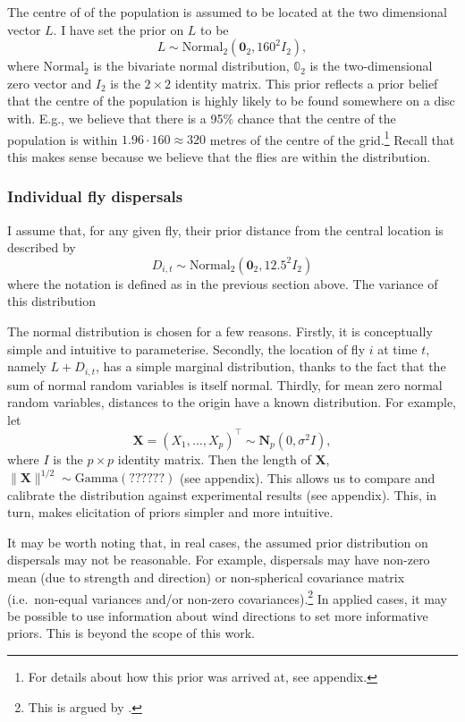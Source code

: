 \documentclass[
]{book}
\begin{document}
The centre of of the population is assumed to be located at the two dimensional vector \(L\). I have set the prior on \(L\) to be
\[
L \sim \mathrm {Normal}_2 (\mathbf 0_2, 160^2 I_2),
\]
where \(\mathrm{Normal}_2\) is the bivariate normal distribution, \(\mathbb 0_2\) is the two-dimensional zero vector and \(I_2\) is the \(2 \times 2\) identity matrix. This prior reflects a prior belief that the centre of the population is highly likely to be found somewhere on a disc with. E.g., we believe that there is a 95\% chance that the centre of the population is within \(1.96 \cdot 160 \approx 320\) metres of the centre of the grid.\footnote{For details about how this prior was arrived at, see appendix.} Recall that this makes sense because we believe that the flies are within the distribution.

\hypertarget{individual-fly-dispersals-1}{%
\subsubsection{Individual fly dispersals}\label{individual-fly-dispersals-1}}

I assume that, for any given fly, their prior distance from the central location is described by
\[
D_{i,t} \sim \mathrm {Normal}_2 (\mathbf 0_2, 12.5^2 I_2)
\]
where the notation is defined as in the previous section above. The variance of this distribution

The normal distribution is chosen for a few reasons. Firstly, it is conceptually simple and intuitive to parameterise. Secondly, the location of fly \(i\) at time \(t\), namely \(L + D_{i, t}\), has a simple marginal distribution, thanks to the fact that the sum of normal random variables is itself normal. Thirdly, for mean zero normal random variables, distances to the origin have a known distribution. For example, let \[\mathbf X = (X_1, \ldots, X_p)^\top \sim \mathbf N_p(0, \sigma^2 I),\] where \(I\) is the \(p \times p\) identity matrix. Then the length of \(\mathbf X\), \(\lVert \mathbf X \rVert^{1/2} \sim \mathrm{Gamma}(??????)\) \citet{unfinished} (see appendix). This allows us to compare and calibrate the distribution against experimental results (see appendix). This, in turn, makes elicitation of priors simpler and more intuitive.

It may be worth noting that, in real cases, the assumed prior distribution on dispersals may not be reasonable. For example, dispersals may have non-zero mean (due to strength and direction) or non-spherical covariance matrix (i.e.~non-equal variances and/or non-zero covariances).\footnote{This is argued by \citet{baker1986}.} In applied cases, it may be possible to use information about wind directions to set more informative priors. This is beyond the scope of this work.
\end{document}
